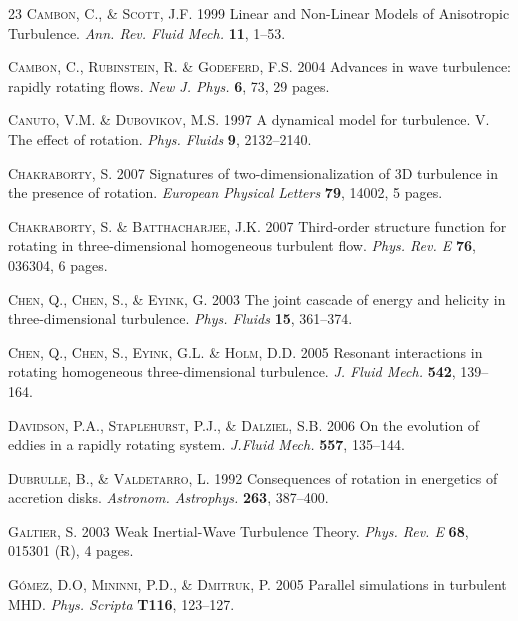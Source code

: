 \documentclass[aps,amsmath,amssymb,floatfix,showpacs]{revtex4}
\begin{document}
\begin{thebibliography}{23}
\textsc{Cambon, C., \& Scott, J.F.}
1999 Linear and Non-Linear Models of Anisotropic Turbulence.
\emph{Ann. Rev. Fluid Mech.} \textbf{11}, 1--53.

\textsc{Cambon, C., Rubinstein, R. \& Godeferd, F.S.}
2004 Advances in wave turbulence: rapidly rotating flows.
\emph{New J. Phys.} \textbf{6}, 73, 29 pages.

\textsc{Canuto, V.M. \& Dubovikov, M.S.}
1997 A dynamical model for turbulence. V. The effect of rotation.
\emph{Phys. Fluids} \textbf{9}, 2132--2140.

\textsc{Chakraborty, S.}
2007 Signatures of two-dimensionalization of 3D turbulence in the presence of rotation.
\emph{European Physical Letters} \textbf{79}, 14002, 5 pages.

\textsc{Chakraborty, S. \& Batthacharjee, J.K.}
2007 Third-order structure function for rotating in three-dimensional homogeneous turbulent flow.
\emph{Phys. Rev. E} \textbf{76}, 036304, 6 pages.

\textsc{Chen, Q., Chen, S., \& Eyink, G.}
2003 The joint cascade of energy and helicity in three-dimensional turbulence.
\emph{Phys. Fluids} \textbf{15}, 361--374.

\textsc{Chen, Q., Chen, S.,  Eyink, G.L. \& Holm, D.D.}
2005 Resonant interactions in rotating homogeneous three-dimensional turbulence.
\emph{J. Fluid Mech.} \textbf{542}, 139--164.

\textsc{Davidson, P.A., Staplehurst, P.J., \& Dalziel, S.B.}
2006 On the evolution of eddies in a rapidly rotating system.
\emph{J.Fluid Mech.} \textbf{557}, 135--144.

\textsc{Dubrulle, B., \& Valdetarro, L.}
1992 Consequences of rotation in energetics of accretion disks.
\emph{Astronom. Astrophys.} \textbf{263}, 387--400.

\textsc{Galtier, S.}
2003 Weak Inertial-Wave Turbulence Theory.
\emph{Phys. Rev. E} \textbf{68}, 015301 (R), 4 pages.

\textsc{G\'omez, D.O, Mininni, P.D., \& Dmitruk, P.}
2005 Parallel simulations in turbulent MHD.
\emph{Phys. Scripta} \textbf{T116}, 123--127.


\end{thebibliography}
\end{document}
